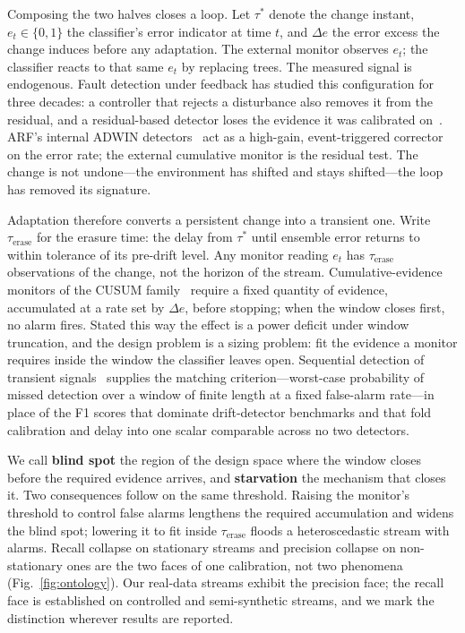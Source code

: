Composing the two halves closes a loop. Let $\tau^{*}$ denote the change instant,
$e_t \in \{0,1\}$ the classifier's error indicator at time $t$, and $\Delta e$ the
error excess the change induces before any adaptation. The external monitor
observes $e_t$; the classifier reacts to that same $e_t$ by replacing trees. The
measured signal is endogenous. Fault detection under feedback has studied this
configuration for three decades: a controller that rejects a disturbance also
removes it from the residual, and a residual-based detector loses the evidence it
was calibrated on~\cite{chen_patton_1999, gertler_1998, isermann_2006}. ARF's
internal ADWIN detectors~\cite{bifet_adwin_2007} act as a high-gain,
event-triggered corrector on the error rate; the external cumulative monitor is
the residual test. The change is not undone---the environment has shifted and
stays shifted---the loop has removed its signature.

Adaptation therefore converts a persistent change into a transient one. Write
$\tau_{\mathrm{erase}}$ for the erasure time: the delay from $\tau^{*}$ until
ensemble error returns to within tolerance of its pre-drift level. Any monitor
reading $e_t$ has $\tau_{\mathrm{erase}}$ observations of the change, not the
horizon of the stream. Cumulative-evidence monitors of the CUSUM
family~\cite{page_1954, lorden_1971, moustakides_1986} require a fixed quantity of
evidence, accumulated at a rate set by $\Delta e$, before stopping; when the
window closes first, no alarm fires. Stated this way the effect is a power
deficit under window truncation, and the design problem is a sizing problem: fit
the evidence a monitor requires inside the window the classifier leaves open.
Sequential detection of transient signals~\cite{nikiforov_2012,
tartakovsky_2023_transient} supplies the matching criterion---worst-case
probability of missed detection over a window of finite length at a fixed
false-alarm rate---in place of the F1 scores that dominate drift-detector
benchmarks and that fold calibration and delay into one scalar comparable across
no two detectors.

We call \textbf{blind spot} the region of the design space where the window
closes before the required evidence arrives, and \textbf{starvation} the
mechanism that closes it. Two consequences follow on the same threshold.
Raising the monitor's threshold to control false alarms lengthens the required
accumulation and widens the blind spot; lowering it to fit inside
$\tau_{\mathrm{erase}}$ floods a heteroscedastic stream with alarms. Recall
collapse on stationary streams and precision collapse on non-stationary ones are
the two faces of one calibration, not two phenomena
(Fig.~\ref{fig:ontology}). Our real-data streams exhibit the precision face; the
recall face is established on controlled and semi-synthetic streams, and we
mark the distinction wherever results are reported.

